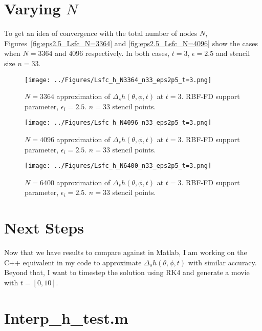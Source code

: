 \documentclass[letter,10pt]{article}
\begin{document}
\clearpage

\section{Varying $N$} 

To get an idea of convergence with the total number of nodes $N$, Figures~\ref{fig:eps2.5_Lsfc_N=3364} and \ref{fig:eps2.5_Lsfc_N=4096} show the cases when $N=3364$ and $4096$ respectively. In both cases, $t=3$, $\epsilon=2.5$ and stencil size $n=33$.  

\begin{figure}[h]
\begin{center}
\texttt{[image: ../Figures/Lsfc\_h\_N3364\_n33\_eps2p5\_t=3.png]}
\caption{$N=3364$ approximation of $\Delta_{s} h(\theta,\phi,t)$ at $t=3$. RBF-FD support parameter, $\epsilon_{i}=2.5$. $n=33$ stencil points. }
\label{fig:eps2.5_Lsfc_N=3364}
\texttt{[image: ../Figures/Lsfc\_h\_N4096\_n33\_eps2p5\_t=3.png]}
\caption{$N=4096$ approximation of $\Delta_{s} h(\theta,\phi,t)$ at $t=3$. RBF-FD support parameter, $\epsilon_{i}=2.5$. $n=33$ stencil points. }
\label{fig:eps2.5_Lsfc_N=4096}
\texttt{[image: ../Figures/Lsfc\_h\_N6400\_n33\_eps2p5\_t=3.png]}
\caption{$N=6400$ approximation of $\Delta_{s} h(\theta,\phi,t)$ at $t=3$. RBF-FD support parameter, $\epsilon_{i}=2.5$. $n=33$ stencil points. }
\label{fig:eps2.5_Lsfc_N=6400}
\end{center}
\end{figure}

\clearpage


\section{Next Steps}
Now that we have results to compare against in Matlab, I am working on the C++ equivalent in my code to approximate $\Delta_{s} h(\theta,\phi,t)$ with similar accuracy. Beyond that, I want to timestep the solution using RK4 and generate a movie with $t=[0,10]$. 

\clearpage



\appendix

\section{Interp\_h\_test.m}
\label{app:Interp_h_test.m}
\clearpage
\end{document}
